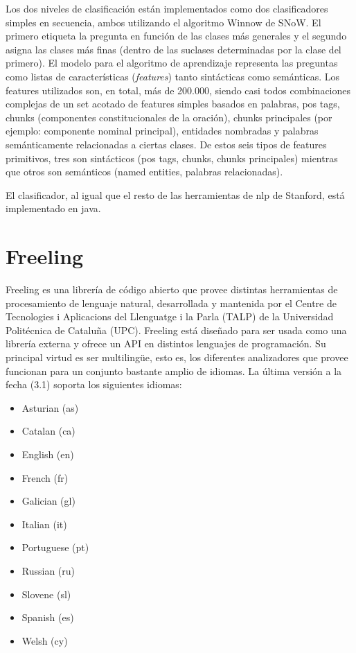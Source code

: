 Los dos niveles de clasificación están implementados como dos clasificadores simples en secuencia, ambos utilizando el algoritmo Winnow de SNoW. El primero etiqueta la pregunta en función de las clases más generales y el segundo asigna las clases más finas (dentro de las suclases determinadas por la clase del primero).
El modelo para el algoritmo de aprendizaje representa las preguntas como listas de características (\textit{features}) tanto sintácticas como semánticas. Los features utilizados son, en total, más de 200.000, siendo casi todos combinaciones complejas de un set acotado de features simples basados en palabras, pos tags, chunks (componentes constitucionales de la oración), chunks principales (por ejemplo: componente nominal principal), entidades nombradas y palabras semánticamente relacionadas a ciertas clases. De estos seis tipos de features primitivos, tres son sintácticos (pos tags, chunks, chunks principales) mientras que otros son semánticos (named entities, palabras relacionadas).

El clasificador, al igual que el resto de las herramientas de nlp de Stanford, está implementado en java.




\section{Freeling}
\label{sec:freeling}
\label{subsec:freeling-pos}
\label{subsec:freeling-mods}
Freeling es una librería de c\'odigo abierto que provee distintas herramientas de
procesamiento de lenguaje natural, desarrollada y mantenida por el Centre de Tecnologies
i Aplicacions del Llenguatge i la Parla (TALP) de la Universidad Politécnica de Catalu\~na (UPC).
Freeling está dise\~nado para ser usada como una librería externa y ofrece un API en distintos lenguajes
de programaci\'on. Su principal virtud es ser multilingüe, esto es, los diferentes analizadores que provee funcionan
para un conjunto bastante amplio de idiomas. La última versi\'on a la fecha (3.1) soporta los siguientes idiomas:

\begin{itemize}
\item Asturian (as)
\item Catalan (ca)
\item English (en)
\item French (fr)
\item Galician (gl)
\item Italian (it)
\item Portuguese (pt)
\item Russian (ru)
\item Slovene (sl)
\item Spanish (es)
\item Welsh (cy)
\end{itemize}

